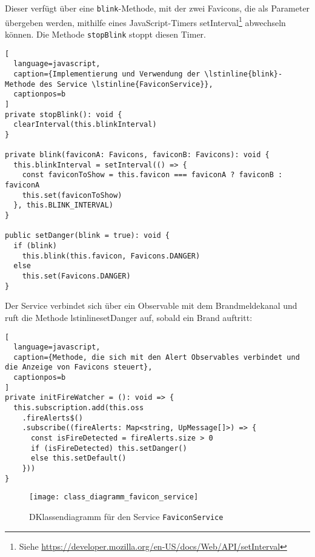 Dieser verfügt über eine \lstinline{blink}-Methode, mit der zwei Favicons, die als Parameter übergeben werden, mithilfe eines JavaScript-Timers setInterval\footnote{Siehe \href{https://developer.mozilla.org/en-US/docs/Web/API/setInterval}{https://developer.mozilla.org/en-US/docs/Web/API/setInterval}} abwechseln können.
Die Methode \lstinline{stopBlink} stoppt diesen Timer.

\begin{lstlisting}[
  language=javascript,
  caption={Implementierung und Verwendung der \lstinline{blink}-Methode des Service \lstinline{FaviconService}},
  captionpos=b
]
private stopBlink(): void {
  clearInterval(this.blinkInterval)
}

private blink(faviconA: Favicons, faviconB: Favicons): void {
  this.blinkInterval = setInterval(() => {
    const faviconToShow = this.favicon === faviconA ? faviconB : faviconA
    this.set(faviconToShow)
  }, this.BLINK_INTERVAL)
}

public setDanger(blink = true): void {
  if (blink)
    this.blink(this.favicon, Favicons.DANGER)
  else
    this.set(Favicons.DANGER)
}
\end{lstlisting}

Der Service verbindet sich über ein Observable mit dem Brandmeldekanal und ruft die Methode lstinline{setDanger} auf, sobald ein Brand auftritt:

\begin{lstlisting}[
  language=javascript,
  caption={Methode, die sich mit den Alert Observables verbindet und die Anzeige von Favicons steuert},
  captionpos=b
]
private initFireWatcher = (): void => {
  this.subscription.add(this.oss
    .fireAlerts$()
    .subscribe((fireAlerts: Map<string, UpMessage[]>) => {
      const isFireDetected = fireAlerts.size > 0
      if (isFireDetected) this.setDanger()
      else this.setDefault()
    }))
}
\end{lstlisting}

\begin{figure}[H]
  \centering
  \texttt{[image: class\_diagramm\_favicon\_service]}
  \caption{DKlassendiagramm für den Service \lstinline{FaviconService}}
  \label{fig:class_diagramm_favicon_service}
\end{figure}

